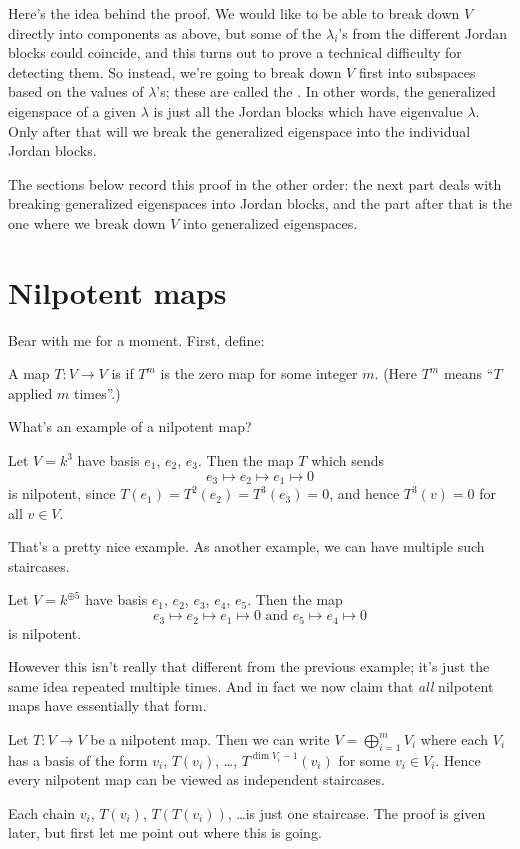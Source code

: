 Here's the idea behind the proof.
We would like to be able to break down $V$ directly into components as above,
but some of the $\lambda_i$'s from the different Jordan blocks could coincide,
and this turns out to prove a technical difficulty for detecting them.
So instead, we're going to break down $V$ first into subspaces based on the values of $\lambda$'s;
these are called the .
In other words, the generalized eigenspace of a given $\lambda$
is just all the Jordan blocks which have eigenvalue $\lambda$.
Only after that will we break the generalized eigenspace into the individual Jordan blocks.

The sections below record this proof in the other order:
the next part deals with breaking generalized eigenspaces into Jordan blocks,
and the part after that is the one where we break down $V$ into
generalized eigenspaces.

\section{Nilpotent maps}
Bear with me for a moment.  First, define:
\begin{definition}
	A map $T: V \to V$ is  if $T^m$ is the zero map for some integer $m$.
	(Here $T^m$ means ``$T$ applied $m$ times''.)
\end{definition}
What's an example of a nilpotent map?
\begin{example}
	Let $V = k^3$ have basis $e_1$, $e_2$, $e_3$.
	Then the map $T$ which sends
	\[ e_3 \mapsto e_2 \mapsto e_1 \mapsto 0 \]
	is nilpotent, since $T(e_1) = T^2(e_2) = T^3(e_3) = 0$,
	and hence $T^3(v) = 0$ for all $v \in V$.
\end{example}
That's a pretty nice example. As another example, we can have multiple such staircases.
\begin{example}
	Let $V = k^{\oplus 5}$ have basis $e_1$, $e_2$, $e_3$, $e_4$, $e_5$.
	Then the map 
	\[ e_3 \mapsto e_2 \mapsto e_1 \mapsto 0 \text{ and }
		e_5 \mapsto e_4 \mapsto 0 \]
	is nilpotent.
\end{example}
However this isn't really that different from the previous example;
it's just the same idea repeated multiple times.
And in fact we now claim that \emph{all} nilpotent maps have essentially that form.

\begin{theorem}
	Let $T : V \to V$ be a nilpotent map.
	Then we can write $V = \bigoplus_{i=1}^m V_i$
	where each $V_i$ has a basis of the form
	$v_i$, $T(v_i)$, \dots, $T^{\dim V_i - 1}(v_i)$
	for some $v_i \in V_i$.
	Hence every nilpotent map can be viewed as independent staircases.
\end{theorem}
Each chain $v_i$, $T(v_i)$, $T(T(v_i))$, \dots is just one staircase.
The proof is given later, but first let me point out where this is going.

